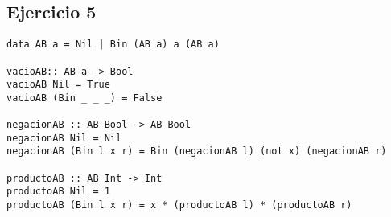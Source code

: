 \subsection{Ejercicio 5}
\begin{centrado}
\begin{verbatim}
data AB a = Nil | Bin (AB a) a (AB a)

vacioAB:: AB a -> Bool
vacioAB Nil = True
vacioAB (Bin _ _ _) = False

negacionAB :: AB Bool -> AB Bool
negacionAB Nil = Nil
negacionAB (Bin l x r) = Bin (negacionAB l) (not x) (negacionAB r)

productoAB :: AB Int -> Int
productoAB Nil = 1
productoAB (Bin l x r) = x * (productoAB l) * (productoAB r)
\end{verbatim}
\end{centrado}